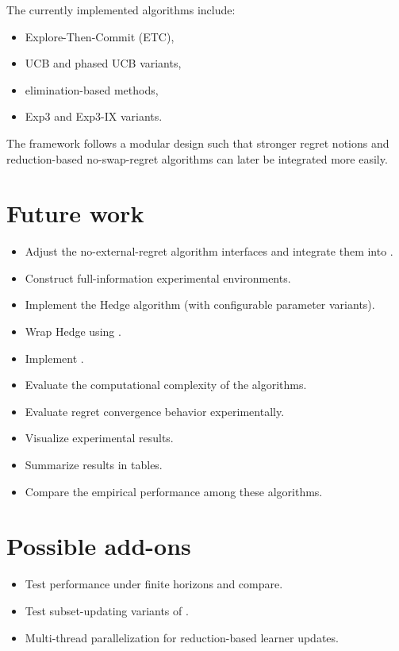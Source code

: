 \documentclass[12pt,a4paper]{article}
\begin{document}
The currently implemented algorithms include:
\begin{itemize}
    \item Explore-Then-Commit (ETC),
    \item UCB and phased UCB variants,
    \item elimination-based methods,
    \item Exp3 and Exp3-IX variants.
\end{itemize}

The framework follows a modular design such that stronger regret notions and reduction-based no-swap-regret algorithms can later be integrated more easily.

\section{Future work}

\begin{itemize}
    \item Adjust the no-external-regret algorithm interfaces and integrate them into \cite{blum2005internal, stoltz2005internal}.
    \item Construct full-information experimental environments.
    \item Implement the Hedge algorithm (with configurable parameter variants).
    \item Wrap Hedge using \cite{blum2005internal, stoltz2005internal, ito2020swap}.
    \item Implement \cite{hart2000regret}.
    \item Evaluate the computational complexity of the algorithms.
    \item Evaluate regret convergence behavior experimentally.
    \item Visualize experimental results.
    \item Summarize results in tables.
    \item Compare the empirical performance among these algorithms.
\end{itemize}

\section{Possible add-ons}

\begin{itemize}
    \item Test performance under finite horizons and compare.
    \item Test subset-updating variants of \cite{ito2020swap}.
    \item Multi-thread parallelization for reduction-based learner updates.
\end{itemize}
\end{document}
